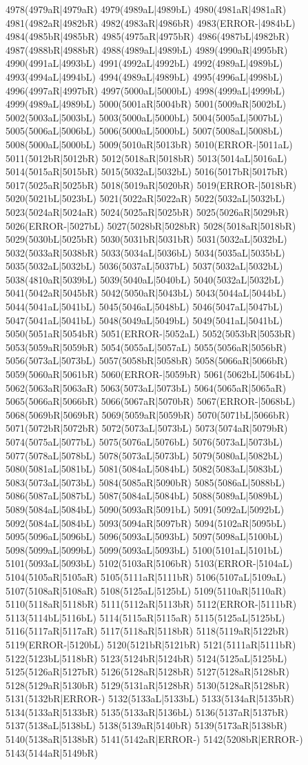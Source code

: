 4978(4979aR|4979aR) 4979(4989aL|4989bL) 4980(4981aR|4981aR) 4981(4982aR|4982bR) 4982(4983aR|4986bR) 4983(ERROR-|4984bL) 4984(4985bR|4985bR) 4985(4975aR|4975bR) 4986(4987bL|4982bR) 4987(4988bR|4988bR) 4988(4989aL|4989bL) 4989(4990aR|4995bR) 4990(4991aL|4993bL) 4991(4992aL|4992bL) 4992(4989aL|4989bL) 4993(4994aL|4994bL) 4994(4989aL|4989bL) 4995(4996aL|4998bL) 4996(4997aR|4997bR) 4997(5000aL|5000bL) 4998(4999aL|4999bL) 4999(4989aL|4989bL) 5000(5001aR|5004bR) 5001(5009aR|5002bL) 5002(5003aL|5003bL) 5003(5000aL|5000bL) 5004(5005aL|5007bL) 5005(5006aL|5006bL) 5006(5000aL|5000bL) 5007(5008aL|5008bL) 5008(5000aL|5000bL) 5009(5010aR|5013bR) 5010(ERROR-|5011aL) 5011(5012bR|5012bR) 5012(5018aR|5018bR) 5013(5014aL|5016aL) 5014(5015aR|5015bR) 5015(5032aL|5032bL) 5016(5017bR|5017bR) 5017(5025aR|5025bR) 5018(5019aR|5020bR) 5019(ERROR-|5018bR) 5020(5021bL|5023bL) 5021(5022aR|5022aR) 5022(5032aL|5032bL) 5023(5024aR|5024aR) 5024(5025aR|5025bR) 5025(5026aR|5029bR) 5026(ERROR-|5027bL) 5027(5028bR|5028bR) 5028(5018aR|5018bR) 5029(5030bL|5025bR) 5030(5031bR|5031bR) 5031(5032aL|5032bL) 5032(5033aR|5038bR) 5033(5034aL|5036bL) 5034(5035aL|5035bL) 5035(5032aL|5032bL) 5036(5037aL|5037bL) 5037(5032aL|5032bL) 5038(4810aR|5039bL) 5039(5040aL|5040bL) 5040(5032aL|5032bL) 5041(5042aR|5045bR) 5042(5050aR|5043bL) 5043(5044aL|5044bL) 5044(5041aL|5041bL) 5045(5046aL|5048bL) 5046(5047aL|5047bL) 5047(5041aL|5041bL) 5048(5049aL|5049bL) 5049(5041aL|5041bL) 5050(5051aR|5054bR) 5051(ERROR-|5052aL) 5052(5053bR|5053bR) 5053(5059aR|5059bR) 5054(5055aL|5057aL) 5055(5056aR|5056bR) 5056(5073aL|5073bL) 5057(5058bR|5058bR) 5058(5066aR|5066bR) 5059(5060aR|5061bR) 5060(ERROR-|5059bR) 5061(5062bL|5064bL) 5062(5063aR|5063aR) 5063(5073aL|5073bL) 5064(5065aR|5065aR) 5065(5066aR|5066bR) 5066(5067aR|5070bR) 5067(ERROR-|5068bL) 5068(5069bR|5069bR) 5069(5059aR|5059bR) 5070(5071bL|5066bR) 5071(5072bR|5072bR) 5072(5073aL|5073bL) 5073(5074aR|5079bR) 5074(5075aL|5077bL) 5075(5076aL|5076bL) 5076(5073aL|5073bL) 5077(5078aL|5078bL) 5078(5073aL|5073bL) 5079(5080aL|5082bL) 5080(5081aL|5081bL) 5081(5084aL|5084bL) 5082(5083aL|5083bL) 5083(5073aL|5073bL) 5084(5085aR|5090bR) 5085(5086aL|5088bL) 5086(5087aL|5087bL) 5087(5084aL|5084bL) 5088(5089aL|5089bL) 5089(5084aL|5084bL) 5090(5093aR|5091bL) 5091(5092aL|5092bL) 5092(5084aL|5084bL) 5093(5094aR|5097bR) 5094(5102aR|5095bL) 5095(5096aL|5096bL) 5096(5093aL|5093bL) 5097(5098aL|5100bL) 5098(5099aL|5099bL) 5099(5093aL|5093bL) 5100(5101aL|5101bL) 5101(5093aL|5093bL) 5102(5103aR|5106bR) 5103(ERROR-|5104aL) 5104(5105aR|5105aR) 5105(5111aR|5111bR) 5106(5107aL|5109aL) 5107(5108aR|5108aR) 5108(5125aL|5125bL) 5109(5110aR|5110aR) 5110(5118aR|5118bR) 5111(5112aR|5113bR) 5112(ERROR-|5111bR) 5113(5114bL|5116bL) 5114(5115aR|5115aR) 5115(5125aL|5125bL) 5116(5117aR|5117aR) 5117(5118aR|5118bR) 5118(5119aR|5122bR) 5119(ERROR-|5120bL) 5120(5121bR|5121bR) 5121(5111aR|5111bR) 5122(5123bL|5118bR) 5123(5124bR|5124bR) 5124(5125aL|5125bL) 5125(5126aR|5127bR) 5126(5128aR|5128bR) 5127(5128aR|5128bR) 5128(5129aR|5130bR) 5129(5131aR|5128bR) 5130(5128aR|5128bR) 5131(5132bR|ERROR-) 5132(5133aL|5133bL) 5133(5134aR|5135bR) 5134(5133aR|5133bR) 5135(5133aR|5136bL) 5136(5137aR|5137bR) 5137(5138aL|5138bL) 5138(5139aR|5140bR) 5139(5173aR|5138bR) 5140(5138aR|5138bR) 5141(5142aR|ERROR-) 5142(5208bR|ERROR-) 5143(5144aR|5149bR) 